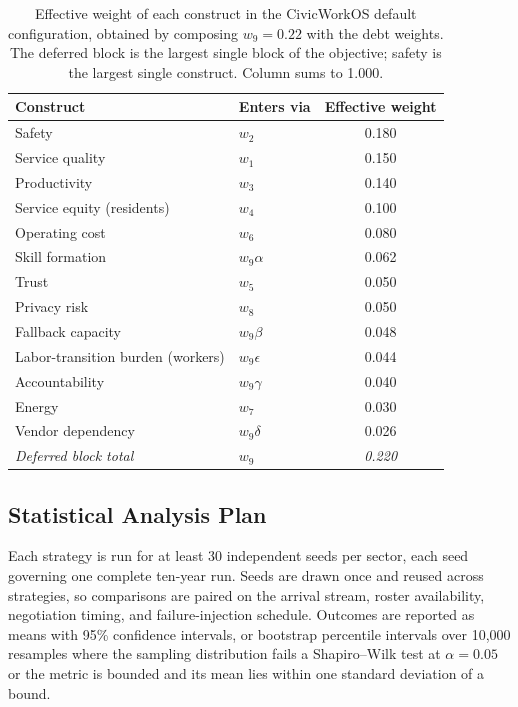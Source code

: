 	\begin{table}[!htbp]
		\caption{Effective weight of each construct in the CivicWorkOS default configuration, obtained by composing $w_9=0.22$ with the debt weights. The deferred block is the largest single block of the objective; safety is the largest single construct. Column sums to 1.000.}
		\label{tab:weights}
		\begin{tabular}{@{}llc@{}}
			\toprule
			\textbf{Construct} & \textbf{Enters via} & \textbf{Effective weight}\\
			\midrule
			Safety & $w_2$ & 0.180\\
			Service quality & $w_1$ & 0.150\\
			Productivity & $w_3$ & 0.140\\
			Service equity (residents) & $w_4$ & 0.100\\
			Operating cost & $w_6$ & 0.080\\
			Skill formation & $w_9\alpha$ & 0.062\\
			Trust & $w_5$ & 0.050\\
			Privacy risk & $w_8$ & 0.050\\
			Fallback capacity & $w_9\beta$ & 0.048\\
			Labor-transition burden (workers) & $w_9\epsilon$ & 0.044\\
			Accountability & $w_9\gamma$ & 0.040\\
			Energy & $w_7$ & 0.030\\
			Vendor dependency & $w_9\delta$ & 0.026\\
			\midrule
			\textit{Deferred block total} & $w_9$ & \textit{0.220}\\
			\bottomrule
		\end{tabular}
	\end{table}
	
	\subsection{Statistical Analysis Plan}
	\label{sec:statplan}
	
	Each strategy is run for at least 30 independent seeds per sector, each seed governing one complete ten-year run. Seeds are drawn once and reused across strategies, so comparisons are paired on the arrival stream, roster availability, negotiation timing, and failure-injection schedule. Outcomes are reported as means with 95\% confidence intervals, or bootstrap percentile intervals over 10{,}000 resamples where the sampling distribution fails a Shapiro--Wilk test at $\alpha=0.05$ or the metric is bounded and its mean lies within one standard deviation of a bound.
	
